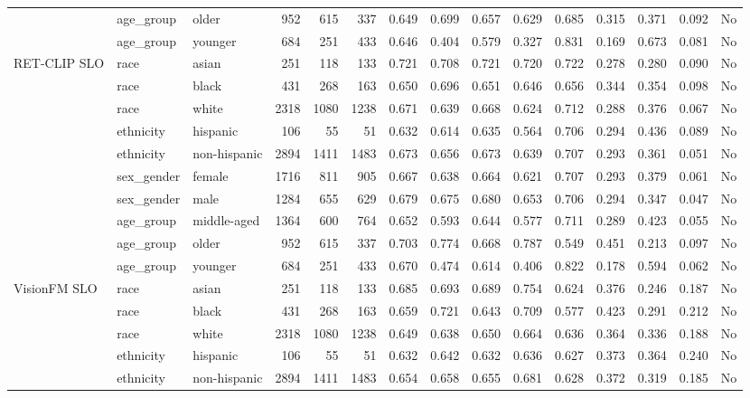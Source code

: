 \begin{longtable}{@{}lllrrrrrrrrrrrr@{}}
 & age\_group & older & 952 & 615 & 337 & 0.649 & 0.699 & 0.657 & 0.629 & 0.685 & 0.315 & 0.371 & 0.092 & No \\
 & age\_group & younger & 684 & 251 & 433 & 0.646 & 0.404 & 0.579 & 0.327 & 0.831 & 0.169 & 0.673 & 0.081 & No \\
RET-CLIP SLO & race & asian & 251 & 118 & 133 & 0.721 & 0.708 & 0.721 & 0.720 & 0.722 & 0.278 & 0.280 & 0.090 & No \\
 & race & black & 431 & 268 & 163 & 0.650 & 0.696 & 0.651 & 0.646 & 0.656 & 0.344 & 0.354 & 0.098 & No \\
 & race & white & 2318 & 1080 & 1238 & 0.671 & 0.639 & 0.668 & 0.624 & 0.712 & 0.288 & 0.376 & 0.067 & No \\
 & ethnicity & hispanic & 106 & 55 & 51 & 0.632 & 0.614 & 0.635 & 0.564 & 0.706 & 0.294 & 0.436 & 0.089 & No \\
 & ethnicity & non-hispanic & 2894 & 1411 & 1483 & 0.673 & 0.656 & 0.673 & 0.639 & 0.707 & 0.293 & 0.361 & 0.051 & No \\
 & sex\_gender & female & 1716 & 811 & 905 & 0.667 & 0.638 & 0.664 & 0.621 & 0.707 & 0.293 & 0.379 & 0.061 & No \\
 & sex\_gender & male & 1284 & 655 & 629 & 0.679 & 0.675 & 0.680 & 0.653 & 0.706 & 0.294 & 0.347 & 0.047 & No \\
 & age\_group & middle-aged & 1364 & 600 & 764 & 0.652 & 0.593 & 0.644 & 0.577 & 0.711 & 0.289 & 0.423 & 0.055 & No \\
 & age\_group & older & 952 & 615 & 337 & 0.703 & 0.774 & 0.668 & 0.787 & 0.549 & 0.451 & 0.213 & 0.097 & No \\
 & age\_group & younger & 684 & 251 & 433 & 0.670 & 0.474 & 0.614 & 0.406 & 0.822 & 0.178 & 0.594 & 0.062 & No \\
VisionFM SLO & race & asian & 251 & 118 & 133 & 0.685 & 0.693 & 0.689 & 0.754 & 0.624 & 0.376 & 0.246 & 0.187 & No \\
 & race & black & 431 & 268 & 163 & 0.659 & 0.721 & 0.643 & 0.709 & 0.577 & 0.423 & 0.291 & 0.212 & No \\
 & race & white & 2318 & 1080 & 1238 & 0.649 & 0.638 & 0.650 & 0.664 & 0.636 & 0.364 & 0.336 & 0.188 & No \\
 & ethnicity & hispanic & 106 & 55 & 51 & 0.632 & 0.642 & 0.632 & 0.636 & 0.627 & 0.373 & 0.364 & 0.240 & No \\
 & ethnicity & non-hispanic & 2894 & 1411 & 1483 & 0.654 & 0.658 & 0.655 & 0.681 & 0.628 & 0.372 & 0.319 & 0.185 & No \\

\end{longtable}
